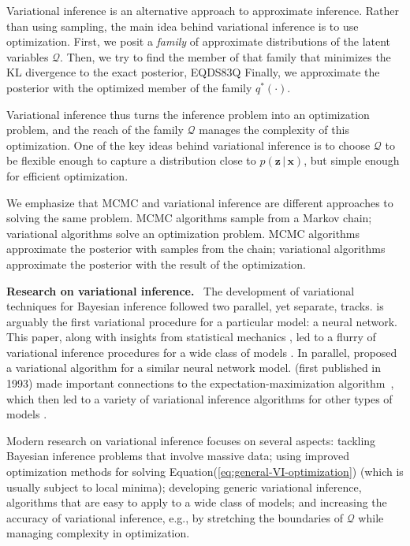 \documentclass{article}
\DeclareRobustCommand{\parhead}[1]{\textbf{#1}~}
\begin{document}
Variational inference is an alternative approach to approximate
inference. Rather than using sampling, the main idea behind variational
inference is to use optimization.  First, we posit a
\emph{family} of approximate distributions of the latent variables
${\mathcal{Q}}$.  Then, we try to find the member of that family that minimizes
the \gls{KL} divergence to the exact posterior,
EQDS83Q
Finally, we approximate the posterior with the optimized member of the
family $q^*(\cdot)$.

Variational inference thus turns the inference problem into an
optimization problem, and the reach of the family ${\mathcal{Q}}$ manages the
complexity of this optimization.  One of the key ideas behind
variational inference is to choose ${\mathcal{Q}}$ to be flexible enough to
capture a distribution close to $p({\mathbf{z}} {\,\vert\,} {\mathbf{x}})$, but simple enough for
efficient optimization.

We emphasize that \gls{MCMC} and variational inference are different
approaches to solving the same problem.  \gls{MCMC} algorithms sample from a
Markov chain; variational algorithms solve an optimization problem.
\gls{MCMC} algorithms approximate the posterior with samples from the
chain; variational algorithms approximate the posterior with the
result of the optimization.

\parhead{Research on variational inference.}  The development of
variational techniques for Bayesian inference followed two parallel,
yet separate, tracks. \citet{Peterson:1987} is arguably the first
variational procedure for a particular model: a neural network. This
paper, along with insights from statistical mechanics
\citep{parisi1988statistical}, led to a flurry of variational
inference procedures for a wide class of models
\citep{saul1996mean,jaakkola1996computing,jaakkola1997variational,
  ghahramani1997factorial,Jordan:1999}.  In parallel,
\citet{Hinton:1993} proposed a variational algorithm for a similar
neural network model. \citet{Neal:1999} (first published in 1993) made
important connections to the expectation-maximization
algorithm~\citep{Dempster:1977}, which then led to a variety of
variational inference algorithms for other types of models
\citep{Waterhouse:1996,mackay1997ensemble}.

Modern research on variational inference focuses on several aspects: 
tackling Bayesian inference problems that involve massive
data; using improved optimization methods for solving
Equation\nobreakspace \textup {(\ref {eq:general-VI-optimization})} (which is usually subject to local
minima); developing generic variational inference, algorithms that are
easy to apply to a wide class of models; and increasing the accuracy
of variational inference, e.g., by stretching the boundaries of
$\mathcal{Q}$ while managing complexity in optimization.
\end{document}
